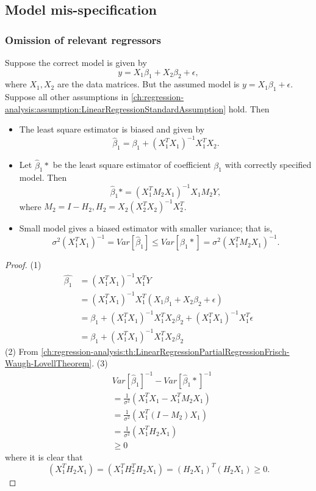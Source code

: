 \begin{refsection}
\subsection{Model mis-specification}
\subsubsection{Omission of relevant regressors}


\begin{lemma}
	Suppose the correct model is given by
	$$y = X_1\beta_1 + X_2\beta_2 + \epsilon,$$
	where $X_1,X_2$ are the data matrices.
	But the assumed model is $y = X_1\beta_1 + \epsilon$. 
	Suppose all other assumptions in \autoref{ch:regression-analysis:assumption:LinearRegressionStandardAssumption} hold.
	Then
	\begin{itemize}
		\item The least square estimator is biased and given by$$\hat{\beta}_1 = \beta_1 +(X_1^TX_1)^{-1}X_1^TX_2.$$
		\item Let $\hat{\beta}_1*$ be the least square estimator of coefficient $\beta_1$ with correctly specified model. Then 
		$$\hat{\beta}_1* = (X_1^TM_2X_1)^{-1}X_1M_2Y,$$
		where $M_2 = I - H_2, H_2 = X_2(X_2^TX_2)^{-1}X_2^T$.
		\item Small model gives a biased estimator with smaller variance; that is,
		$$\sigma^2(X_1^TX_1)^{-1} = Var[\hat{\beta}_1] \leq Var[\hat{\beta}_1*] = \sigma^2(X_1^TM_2X_1)^{-1}.$$
	\end{itemize}	
\end{lemma}
\begin{proof}
	(1)	
	\begin{align*}
	\hat{\beta_1} &= (X_1^TX_1)^{-1}X_1^TY \\
	&= (X_1^TX_1)^{-1}X_1^T(X_1\beta_1 + X_2\beta_2 + \epsilon) \\
	&= \beta_1 + (X_1^TX_1)^{-1}X_1^TX_2\beta_2 + (X_1^TX_1)^{-1}X_1^T\epsilon \\
	&= \beta_1 + (X_1^TX_1)^{-1}X_1^TX_2\beta_2
	\end{align*}	
	(2) From \autoref{ch:regression-analysis:th:LinearRegressionPartialRegressionFrisch-Waugh-LovellTheorem}.
	(3) 
	\begin{align*}
	& Var[\hat{\beta}_1]^{-1} - Var[\hat{\beta}_1*]^{-1} \\
	& = \frac{1}{\sigma^2}(X_1^TX_1 - X_1^TM_2X_1) \\
	& = \frac{1}{\sigma^2}(X_1^T(I-M_2)X_1) \\
	& = \frac{1}{\sigma^2}(X_1^TH_2X_1) \\
	& \geq 0
	\end{align*}
	where it is clear that $$(X_1^TH_2X_1) = (X_1^TH_2^TH_2X_1) = (H_2X_1)^T(H_2X_1)\geq 0.$$
\end{proof}



\end{refsection}
